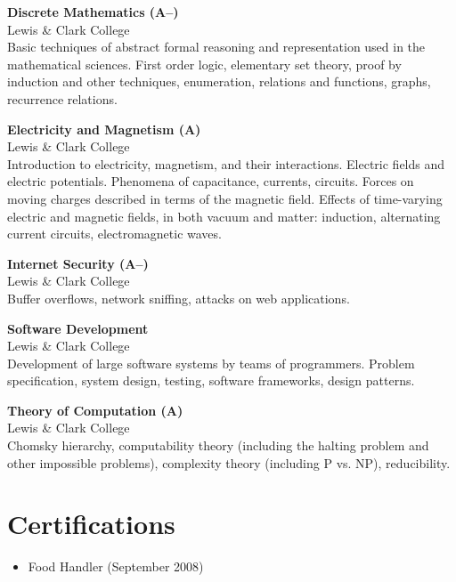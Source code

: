 \documentclass{res}
\begin{document}
\begin{resume}
    \textbf{Discrete Mathematics (A--)}\\
    Lewis \& Clark College\\
    Basic techniques of abstract formal reasoning and representation used in the
    mathematical sciences. First order logic, elementary set theory, proof by
    induction and other techniques, enumeration, relations and functions,
    graphs, recurrence relations.

    \textbf{Electricity and Magnetism (A)}\\
    Lewis \& Clark College\\
    Introduction to electricity, magnetism, and their interactions. Electric
    fields and electric potentials. Phenomena of capacitance, currents,
    circuits. Forces on moving charges described in terms of the magnetic field.
    Effects of time-varying electric and magnetic fields, in both vacuum and
    matter: induction, alternating current circuits, electromagnetic waves.

    \textbf{Internet Security (A--)}\\
    Lewis \& Clark College\\
    Buffer overflows, network sniffing, attacks on web applications.

    \textbf{Software Development}\\
    Lewis \& Clark College\\
    Development of large software systems by teams of programmers.  Problem
    specification, system design, testing, software frameworks, design patterns.

    \textbf{Theory of Computation (A)}\\
    Lewis \& Clark College\\
    Chomsky hierarchy, computability theory (including the halting problem and
    other impossible problems), complexity theory (including P vs.  NP),
    reducibility.
 
\section{Certifications}
    \begin{itemize}
        \item Food Handler (September 2008)
    \end{itemize}


\end{resume}
\end{document}
